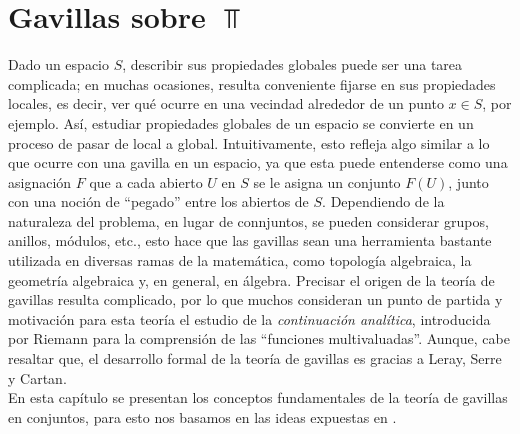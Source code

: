 \chapter{Gavillas sobre $\Top$}
Dado un espacio $S$, describir sus propiedades globales puede ser una tarea complicada; en muchas ocasiones, resulta conveniente fijarse en sus propiedades locales, es decir, ver qué ocurre en una vecindad alrededor de un punto $x\in S$, por ejemplo. Así, estudiar propiedades globales de un espacio se convierte en un proceso de pasar de local a global. Intuitivamente, esto refleja algo similar a lo que ocurre con una gavilla en un espacio, ya que esta puede entenderse como una asignación $F$ que a cada abierto $U$ en $S$ se le asigna un conjunto $F(U)$, junto con una noción de ``pegado'' entre los abiertos de $S$. Dependiendo de la naturaleza del problema, en lugar de connjuntos, se pueden considerar grupos, anillos, módulos, etc., esto hace que las gavillas sean una herramienta bastante utilizada  en diversas ramas de la matemática, como topología algebraica, la geometría algebraica y, en general, en álgebra. Precisar el origen de la teoría de gavillas resulta complicado, por lo que muchos consideran un punto de partida y motivación para esta teoría el estudio de la \emph{continuación analítica}, introducida por Riemann para la comprensión de las ``funciones multivaluadas''. Aunque, cabe resaltar que, el desarrollo formal de la teoría de gavillas es gracias a Leray, Serre y Cartan. \\
En esta capítulo se presentan los conceptos fundamentales de la teoría de gavillas en conjuntos, para esto nos basamos en las ideas expuestas en \cite{maclane2012sheaves}.
